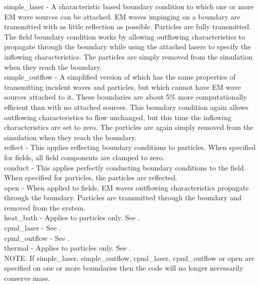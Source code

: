 {\emphtext simple\_laser} - A characteristic based boundary condition to which
one or more EM wave sources can be attached. EM waves impinging on a
 boundary are transmitted with as little reflection
as possible. Particles are fully transmitted. The field boundary condition
works by allowing outflowing characteristics to propagate through the boundary
while using the attached lasers to specify the inflowing characteristics. The
particles are simply removed from the simulation when they reach the
boundary.\\

{\emphtext simple\_outflow} - A simplified version of 
which has the same properties of transmitting incident waves and
particles, but which cannot have EM wave sources attached to it. These
boundaries are about 5\% more computationally efficient than
 with no attached sources. This boundary
condition again allows outflowing characteristics to flow unchanged, but this
time the inflowing characteristics are set to zero. The particles are again
simply removed from the simulation when they reach the boundary.\\

{\emphtext reflect} - This applies reflecting boundary conditions to
  particles. When specified for fields, all field components are clamped
  to zero.\\

{\emphtext conduct} - This applies perfectly conducting boundary conditions
  to the field. When specified for particles, the particles are reflected.\\

{\emphtext open} - When applied to fields, EM waves outflowing characteristics
  propagate through the boundary. Particles are transmitted through the boundary
  and removed from the system.\\

{\emphtext heat\_bath} - Applies to particles only. See .\\

{\emphtext cpml\_laser} - See .\\

{\emphtext cpml\_outflow} - See .\\

{\emphtext thermal} - Applies to particles only. See .\\

{\emphtext NOTE: If simple\_laser, simple\_outflow, cpml\_laser,
cpml\_outflow or open are specified on one or more boundaries then the code
will no longer necessarily conserve mass.}\\

